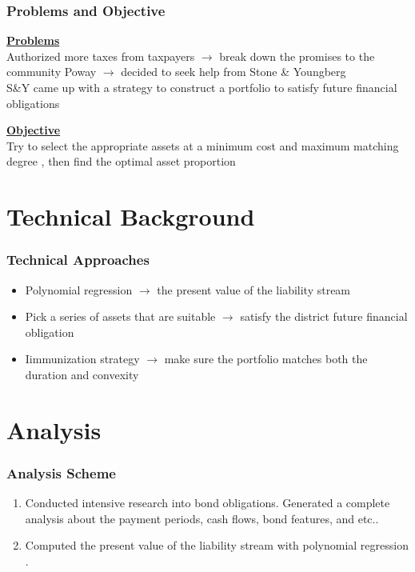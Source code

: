 \documentclass[compress,handout,10pt]{beamer}
\let\olditem\item
\renewcommand{\item}{\setlength{\itemsep}{0.5\baselineskip}\olditem}
\begin{document}
\begin{frame}
    \frametitle{Problems and Objective}
\underline{ \bf{\large {Problems}}}\\
\vspace{3mm}
Authorized more taxes from taxpayers $\rightarrow$ break down the promises to the community Poway  $\rightarrow$ decided to seek help from Stone \& Youngberg \\
\vspace{3mm}
S\&Y came up with a strategy to construct a portfolio to satisfy future financial obligations\\
\vspace{8mm}

\underline{ \bf{\large {Objective}}}\\
\vspace{3mm}
Try to select the appropriate assets at a minimum cost and  maximum matching degree , then find the optimal asset proportion


\end{frame}

\section{Technical Background}

\begin{frame}
    \frametitle{Technical Approaches}
\begin{itemize}
\item Polynomial regression $\rightarrow$ the present value of the liability stream\\
\item Pick a series of assets that are suitable $\rightarrow$ satisfy the  district future financial obligation\\
\item Iimmunization strategy  $\rightarrow$ make sure the portfolio  matches both the duration and convexity 
\end{itemize}
\end{frame}


\section{Analysis}
\begin {frame}
\frametitle{Analysis Scheme}
\begin{enumerate}[step 1]
    \item Conducted intensive research into bond obligations. Generated a complete analysis about the payment periods, cash flows, bond features, and etc..\\
\vspace{5mm}
    \item Computed the present value of the liability stream with polynomial regression  \\
.
\end{enumerate}
\end{frame}
\end{document}
